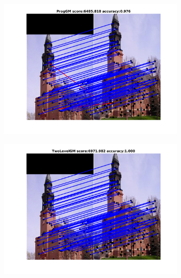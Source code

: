 \documentclass[
	fontsize=12pt,
	paper=a4,
	twoside=false,
	numbers=noenddot,
	plainheadsepline,
	toc=listof,
	toc=bibliography
]{scrartcl}
\begin{document}
\begin{figure}[h]
	\begin{subfigure}[b]{0.33\textwidth}
		\centering
		\includegraphics[scale=0.25]{"fig_ver2608/RealImages/ImgTrafo/no_descr/using_cpd_afftrafo/fi_2_ProgGM"} 
	\end{subfigure}%
	\begin{subfigure}[b]{0.33\textwidth}
		\centering
		\includegraphics[scale=0.25]{"fig_ver2608/RealImages/ImgTrafo/no_descr/using_cpd_afftrafo/fi_2_TwoLevelGM"} 
	\end{subfigure} 
	\begin{subfigure}[b]{0.33\textwidth}
		\centering

\end{subfigure}
\end{figure}
\end{document}
